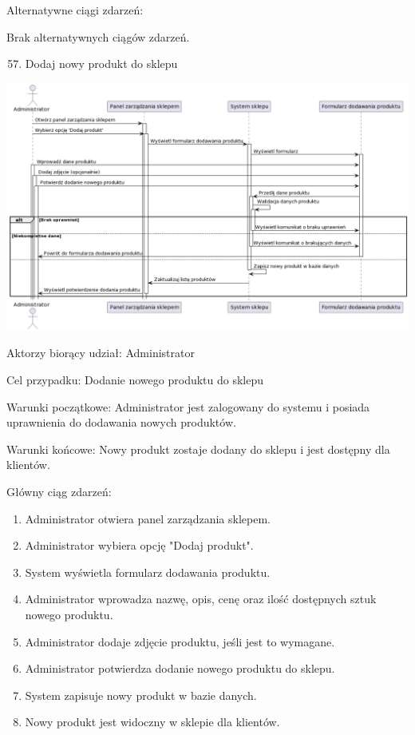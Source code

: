 \documentclass[
]{article}
\providecommand{\tightlist}{%
  \setlength{\itemsep}{0pt}\setlength{\parskip}{0pt}}
\begin{document}
{Alternatywne ciągi zdarzeń:}

{Brak alternatywnych ciągów zdarzeń.}

{}

\begin{enumerate}
\setcounter{enumi}{56}
\tightlist
\item
  {Dodaj nowy produkt do sklepu}
\end{enumerate}

{\includegraphics{diagrams/sequence/sklep_dodaj_nowy_produkt.png}}

{Aktorzy biorący udział: Administrator}

{Cel przypadku: Dodanie nowego produktu do sklepu}

{Warunki początkowe: Administrator jest zalogowany do systemu i posiada
uprawnienia do dodawania nowych produktów.}

{Warunki końcowe: Nowy produkt zostaje dodany do sklepu i jest dostępny
dla klientów.}

{Główny ciąg zdarzeń:}

\begin{enumerate}
\tightlist
\item
  {Administrator otwiera panel zarządzania sklepem.}
\item
  {Administrator wybiera opcję "Dodaj produkt".}
\item
  {System wyświetla formularz dodawania produktu.}
\item
  {Administrator wprowadza nazwę, opis, cenę oraz ilość dostępnych sztuk
  nowego produktu.}
\item
  {Administrator dodaje zdjęcie produktu, jeśli jest to wymagane.}
\item
  {Administrator potwierdza dodanie nowego produktu do sklepu.}
\item
  {System zapisuje nowy produkt w bazie danych.}
\item
  {Nowy produkt jest widoczny w sklepie dla klientów.}
\end{enumerate}
\end{document}
